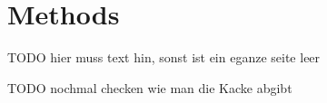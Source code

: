\chapter{Methods}
\label{cha:Methods}


TODO hier muss text hin, sonst ist ein eganze seite leer



TODO nochmal checken wie man die Kacke abgibt